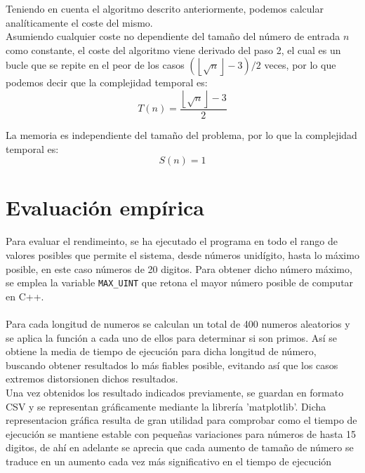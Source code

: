 Teniendo en cuenta el algoritmo descrito anteriormente, podemos calcular analíticamente el coste del mismo.\\
Asumiendo cualquier coste no dependiente del tamaño del número de entrada $n$ como constante, el coste del algoritmo viene derivado del paso 2, el cual es un bucle que se repite en el peor de los casos $(\left \lfloor \sqrt{n} \right \rfloor - 3)/2$ veces, por lo que podemos decir que la complejidad temporal es:
\begin{equation}
    T(n) = \frac{\left \lfloor \sqrt{n} \right \rfloor - 3}{2}
\end{equation}

La memoria es independiente del tamaño del problema, por lo que la complejidad temporal es:
\begin{equation}
    S(n) = 1
\end{equation}



\section{Evaluación empírica}

Para evaluar el rendimeinto, se ha ejecutado el programa en todo el rango de valores posibles que permite el sistema, desde números unidígito, hasta lo máximo posible, en este caso números de 20 digitos. Para obtener dicho número máximo, se emplea la variable \texttt{MAX\_UINT} que retona el mayor número posible de computar en C++.\\
\\
Para cada longitud de numeros se calculan un total de 400 numeros aleatorios y se aplica la función a cada uno de ellos para determinar si son primos. Así se obtiene la media de tiempo de ejecución para dicha longitud de número, buscando obtener resultados lo más fiables posible, evitando así que los casos extremos distorsionen dichos resultados.\\


Una vez obtenidos los resultado indicados previamente, se guardan en formato CSV y se representan gráficamente mediante la librería 'matplotlib'. Dicha representacion gráfica resulta de gran utilidad para comprobar como el tiempo de ejecución se mantiene estable con pequeñas variaciones para números de hasta 15 digitos, de ahí en adelante se aprecia que cada aumento de tamaño de número se traduce en un aumento cada vez más significativo en el tiempo de ejecución\\

